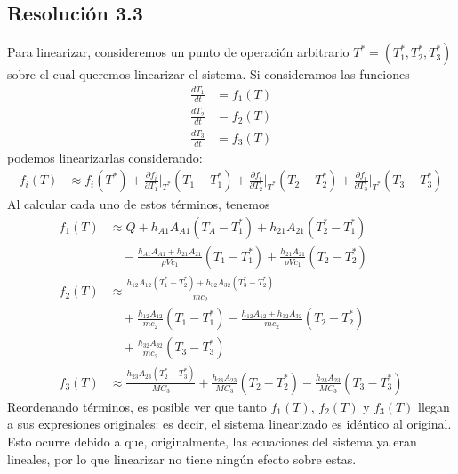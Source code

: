 \documentclass[
  11pt,
  letterpaper,
   addpoints,
   answers
  ]{exam}
\begin{document}
\begin{questions}
\begin{solution}
\subsection*{Resolución 3.3}
Para linearizar, consideremos un punto de operación arbitrario $T^* = (T_1^*, T_2^*, T_3^*)$ sobre el cual queremos linearizar el sistema. Si consideramos las funciones
\begin{align}
    \frac{dT_1}{dt} &= f_1(T) \tag{27} \\
    \frac{dT_2}{dt} &= f_2(T) \tag{28} \\
    \frac{dT_3}{dt} &= f_3(T) \tag{29}
\end{align}
podemos linearizarlas considerando:
\begin{align}
    f_i(T) &\approx f_i(T^*) + \frac{\partial f_i}{\partial T_1}\Big|_{T^*} (T_1 - T_1^*) + \frac{\partial f_i}{\partial T_2}\Big|_{T^*} (T_2 - T_2^*) + \frac{\partial f_i}{\partial T_3}\Big|_{T^*} (T_3 - T_3^*) \tag{30}
\end{align}
Al calcular cada uno de estos términos, tenemos
\begin{align}
    f_1(T) &\approx Q + h_{A1}A_{A1} (T_A - T_1^*) + h_{21}A_{21} (T_2^* - T_1^*) \nonumber \\
    &\quad - \frac{h_{A1}A_{A1} + h_{21}A_{21}}{\rho V c_1} (T_1 - T_1^*) + \frac{h_{21}A_{21}}{\rho V c_1} (T_2 - T_2^*) \tag{31} \\
    f_2(T) &\approx \frac{h_{12}A_{12} (T_1^* - T_2^*) + h_{32}A_{32} (T_3^* - T_2^*)}{mc_2} \nonumber \\
    &\quad + \frac{h_{12}A_{12}}{mc_2} (T_1 - T_1^*) - \frac{h_{12}A_{12} + h_{32}A_{32}}{mc_2} (T_2 - T_2^*) \nonumber \\
    &\quad + \frac{h_{32}A_{32}}{mc_2} (T_3 - T_3^*) \tag{32} \\
    f_3(T) &\approx \frac{h_{23}A_{23} (T_2^* - T_3^*)}{MC_3} + \frac{h_{23}A_{23}}{MC_3} (T_2 - T_2^*) - \frac{h_{23}A_{23}}{MC_3} (T_3 - T_3^*) \tag{33}
    \end{align}    
Reordenando términos, es posible ver que tanto $f_1(T)$, $f_2(T)$ y $f_3(T)$ llegan a sus expresiones originales: es decir, el sistema linearizado es idéntico al original. Esto ocurre debido a que, originalmente, las ecuaciones del sistema ya eran lineales, por lo que linearizar no tiene ningún efecto sobre estas.    

    
\end{solution}
\end{questions}
\newpage
\end{document}
